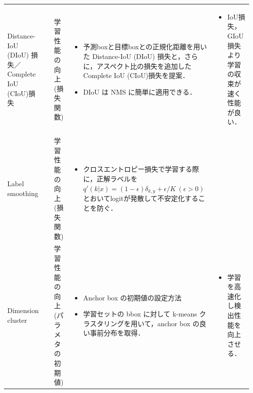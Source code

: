 \documentclass[originalpaper,fleqn]{jsaiart}     %
\begin{document}
\begin{table}
\begin{center}
\begin{tabularx}{\linewidth}{Xp{1.5cm}Xp{7cm}X}
            Distance-IoU (DIoU) 損失／Complete IoU (CIoU)損失
            & \cite{ZWLLYR20} & 学習性能の向上 (損失関数) & 
            \begin{itemize}
                \vspace{-0.7\baselineskip}
                \setlength{\leftskip}{-3mm}
                \item 予測boxと目標boxとの正規化距離を用いた Distance-IoU (DIoU) 損失と，さらに，アスペクト比の損失を追加したComplete IoU (CIoU)損失を提案．
                \item DIoU は NMS に簡単に適用できる．
            \end{itemize}
            &
            \begin{itemize}
                \vspace{-0.7\baselineskip}
                \setlength{\leftskip}{-3mm}
                \item IoU損失，GIoU損失より学習の収束が速く性能が良い．
            \end{itemize}
            \\

            Label smoothing
            & \cite{SVISW16} & 学習性能の向上 (損失関数) & 
            \begin{itemize}
                \vspace{-0.7\baselineskip}
                \setlength{\leftskip}{-3mm}
                \item クロスエントロピー損失で学習する際に，正解ラベルを $q'(k|x){=}(1{-}\epsilon)\delta_{k,y}{+}\epsilon/K \ (\epsilon{>}0)$とおいてlogitが発散して不安定化することを防ぐ．
            \end{itemize}
            &
            \\

            Dimension cluster
            & \cite{RedFar17} & 学習性能の向上 (パラメタの初期値) & 
            \begin{itemize}
                \vspace{-0.7\baselineskip}
                \setlength{\leftskip}{-3mm}
                \item Anchor box の初期値の設定方法
                \item 学習セットの bbox に対して k-means クラスタリングを用いて，anchor box の良い事前分布を取得．
            \end{itemize}
            &
            \begin{itemize}
                \vspace{-0.7\baselineskip}
                \setlength{\leftskip}{-3mm}
                \item 学習を高速化し検出性能を向上させる．
            \end{itemize}
            \\


\end{tabularx}
\end{center}
\end{table}
\end{document}
